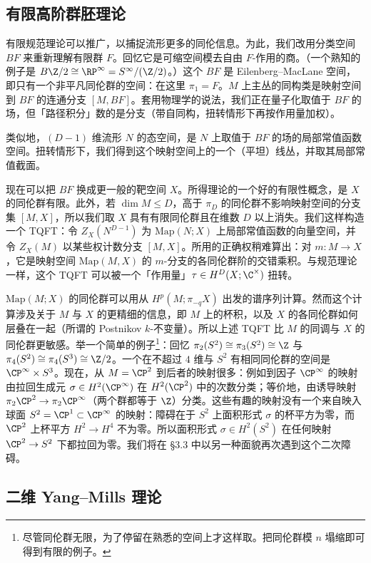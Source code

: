 \subsection{有限高阶群胚理论}

有限规范理论可以推广，以捕捉流形更多的同伦信息。为此，我们改用分类空间 $BF$ 来重新理解有限群 $F$。回忆它是可缩空间模去自由 $F$-作用的商。（一个熟知的例子是 $B\Z/2\cong\RP^\infty=S^\infty/(\Z/2)$。）这个 $BF$ 是 Eilenberg--MacLane 空间，即只有一个非平凡同伦群的空间：在这里 $\pi_1=F$。$M$ 上主丛的同构类是映射空间到 $BF$ 的连通分支 $[M,BF]$。套用物理学的说法，我们正在量子化取值于 $BF$ 的场，但「路径积分」数的是分支（带自同构，扭转情形下再按作用量加权）。

类似地，$(D-1)$ 维流形 $N$ 的态空间，是 $N$ 上取值于 $BF$ 的场的局部常值函数空间。扭转情形下，我们得到这个映射空间上的一个（平坦）线丛，并取其局部常值截面。

现在可以把 $BF$ 换成更一般的靶空间 $X$。所得理论的一个好的有限性概念，是 $X$ 的同伦群有限。此外，若 $\dim M\le D$，高于 $\pi_D$ 的同伦群不影响映射空间的分支集 $[M,X]$，所以我们取 $X$ 具有有限同伦群且在维数 $D$ 以上消失。我们这样构造一个 TQFT：令 $Z_X(N^{D-1})$ 为 $\mathrm{Map}(N;X)$ 上局部常值函数的向量空间，并令 $Z_X(M)$ 以某些权计数分支 $[M,X]$。所用的正确权稍难算出：对 $m\colon M\to X$，它是映射空间 $\mathrm{Map}(M,X)$ 的 $m$-分支的各同伦群阶的交错乘积。与规范理论一样，这个 TQFT 可以被一个「作用量」$\tau\in H^D(X;\C^\times)$ 扭转。

$\mathrm{Map}(M;X)$ 的同伦群可以用从 $H^p(M;\pi_{-q}X)$ 出发的谱序列计算。然而这个计算涉及关于 $M$ 与 $X$ 的更精细的信息，即 $M$ 上的杯积，以及 $X$ 的各同伦群如何层叠在一起（所谓的 Postnikov $k$-不变量）。所以上述 TQFT 比 $M$ 的同调与 $X$ 的同伦群更敏感。举一个简单的例子\footnote{尽管同伦群无限，为了停留在熟悉的空间上才这样取。把同伦群模 $n$ 塌缩即可得到有限的例子。}：回忆 $\pi_2(S^2)\cong\pi_3(S^2)\cong\Z$ 与 $\pi_4(S^2)\cong\pi_4(S^3)\cong\Z/2$。一个在不超过 $4$ 维与 $S^2$ 有相同同伦群的空间是 $\CP^\infty\times S^3$。现在，从 $M=\CP^2$ 到后者的映射很多：例如到因子 $\CP^\infty$ 的映射由拉回生成元 $\sigma\in H^2(\CP^\infty)$ 在 $H^2(\CP^2)$ 中的次数分类；等价地，由诱导映射 $\pi_2\CP^2\to\pi_2\CP^\infty$（两个群都等于 $\Z$）分类。这些有趣的映射没有一个来自映入球面 $S^2=\CP^1\subset\CP^\infty$ 的映射：障碍在于 $S^2$ 上面积形式 $\sigma$ 的杯平方为零，而 $\CP^2$ 上杯平方 $H^2\to H^4$ 不为零。所以面积形式 $\sigma\in H^2(S^2)$ 在任何映射 $\CP^2\to S^2$ 下都拉回为零。我们将在 §3.3 中以另一种面貌再次遇到这个二次障碍。

\subsection{二维 Yang--Mills 理论}

